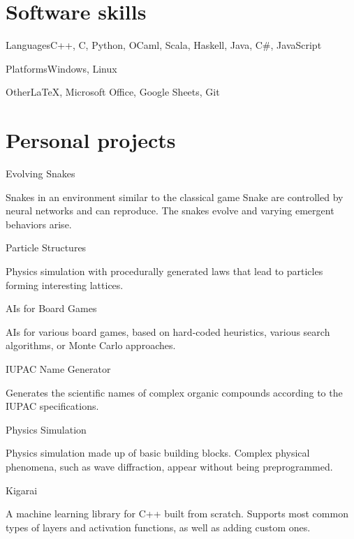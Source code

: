 \documentclass{tccv}
\begin{document}
\section{Software skills}

\begin{factlist}

\item{Languages}{C++, C, Python, OCaml, Scala, Haskell, Java, C\#, JavaScript}
\item{Platforms}{Windows, Linux}
\item{Other}{\LaTeX, Microsoft Office, Google Sheets, Git}

\end{factlist}

\newpage


\section{Personal projects}

\begin{projectlist}

\item{Evolving Snakes}

Snakes in an environment similar to the classical game Snake are controlled by neural networks and can reproduce. The snakes evolve and varying emergent behaviors arise.

\item{Particle Structures}

Physics simulation with procedurally generated laws that lead to particles
forming interesting lattices.

\item{AIs for Board Games}

AIs for various board games, based on hard-coded heuristics, various search algorithms, or Monte Carlo approaches.

\item{IUPAC Name Generator}

Generates the scientific names of complex organic compounds according to the IUPAC specifications.

\item{Physics Simulation}

Physics simulation made up of basic building blocks. Complex physical phenomena, such as wave diffraction, appear without being preprogrammed.

\item{Kigarai}

A machine learning library for C++ built from scratch. Supports most common types of layers and activation functions, as well as adding custom ones.

\end{projectlist}
\end{document}
